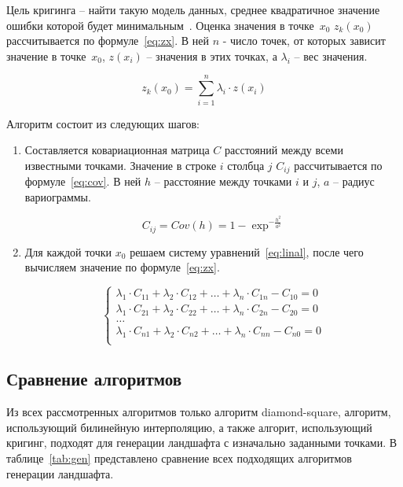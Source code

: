 Цель кригинга – найти такую модель данных, среднее квадратичное значение ошибки которой будет минимальным~\cite{criging}. Оценка значения в точке~$x_0$ $z_k(x_0)$ рассчитывается по формуле~\ref{eq:zx}. В ней $n$ - число точек, от которых зависит значение в точке~$x_0$, $z(x_i)$ -- значения в этих точках, а $\lambda_i$ -- вес значения.

\begin{equation}
	\label{eq:zx}
	z_k(x_0) = \sum_{i=1}^{n}\lambda_i \cdot z(x_i)
\end{equation}

Алгоритм состоит из следующих шагов:

\begin{enumerate}[label=\arabic*.]
	\item Составляется ковариационная матрица $C$ расстояний между всеми известными точками. Значение в строке $i$ столбца $j$ $C_{ij}$ рассчитывается по формуле~\ref{eq:cov}. В ней $h$ -- расстояние между точками $i$ и $j$, $a$ -- радиус вариограммы.
	
\begin{equation}
	\label{eq:cov}
	C_{ij} = Cov(h) = 1 - \exp^{-\frac{h^2}{a^2}}
\end{equation}
	
	\item Для каждой точки $x_0$ решаем систему уравнений~\ref{eq:linal}, после чего вычисляем значение по формуле~\ref{eq:zx}.
	
\begin{equation}
	\label{eq:linal}
	\begin{cases}
		\lambda_1 \cdot C_{11} + \lambda_2 \cdot C_{12} + \ldots + \lambda_n \cdot C_{1n} - C_{10} = 0\\
		\lambda_1 \cdot C_{21} + \lambda_2 \cdot C_{22} + \ldots + \lambda_n \cdot C_{2n} - C_{20} = 0\\
		\ldots\\
		\lambda_1 \cdot C_{n1} + \lambda_2 \cdot C_{n2} + \ldots + \lambda_n \cdot C_{nn} - C_{n0} = 0\\
	\end{cases}
\end{equation}

\end{enumerate}

\subsection{Сравнение алгоритмов}

Из всех рассмотренных алгоритмов только алгоритм diamond-square, алгоритм, использующий билинейную интерполяцию, а также алгорит, использующий кригинг, подходят для генерации ландшафта с изначально заданными точками. В таблице~\ref{tab:gen} представлено сравнение всех подходящих алгоритмов генерации ландшафта.

